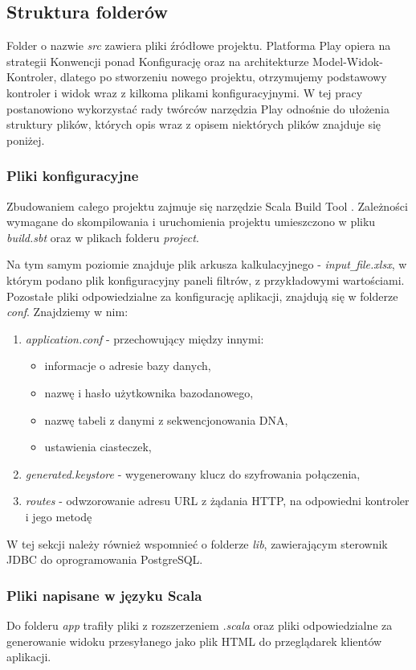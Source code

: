 \documentclass[a4paper,12pt,twoside]{article}
\begin{document}
\subsection{Struktura folderów}
Folder o nazwie \textit{src} zawiera pliki źródłowe projektu.
Platforma Play opiera na strategii Konwencji ponad Konfigurację
oraz na architekturze Model-Widok-Kontroler,
dlatego po stworzeniu nowego projektu,
otrzymujemy podstawowy kontroler i widok wraz z kilkoma plikami konfiguracyjnymi.
W tej pracy postanowiono wykorzystać rady twórców narzędzia Play
odnośnie do ułożenia struktury plików, których opis wraz z opisem niektórych plików znajduje się poniżej.

\subsubsection{Pliki konfiguracyjne}
Zbudowaniem całego projektu zajmuje się narzędzie Scala Build Tool \cite{sbt}.
Zależności wymagane do skompilowania i uruchomienia projektu
umieszczono w pliku \textit{build.sbt} oraz w plikach folderu \textit{project}.

Na tym samym poziomie znajduje plik arkusza kalkulacyjnego -
\textit{input}\verb!_!\textit{file.xlsx}, w którym podano plik konfiguracyjny paneli filtrów,
z przykładowymi wartościami.
Pozostałe pliki odpowiedzialne za konfigurację aplikacji, znajdują
się w folderze \textit{conf}.
Znajdziemy w nim:
\begin{enumerate}[1)]
\item \textit{application.conf} - przechowujący między innymi:
\begin{itemize}
\item informacje o adresie bazy danych,
\item nazwę i hasło użytkownika bazodanowego,
\item nazwę tabeli z danymi z sekwencjonowania DNA,
\item ustawienia ciasteczek,
\end{itemize}
\item \textit{generated.keystore} - wygenerowany klucz do szyfrowania połączenia,
\item \textit{routes} - odwzorowanie adresu URL z żądania HTTP, na odpowiedni kontroler
i jego metodę
\end{enumerate}

W tej sekcji należy również wspomnieć o folderze \textit{lib}, zawierającym
sterownik JDBC do oprogramowania PostgreSQL.

\newpage
\subsubsection{Pliki napisane w języku Scala}
Do folderu \textit{app} trafiły pliki z rozszerzeniem \textit{.scala} oraz pliki
odpowiedzialne za generowanie widoku przesyłanego jako plik HTML do
przeglądarek klientów aplikacji.
\end{document}
